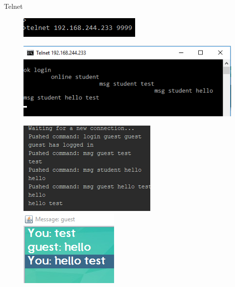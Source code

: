 \documentclass{beamer}
\begin{document}
\begin{frame}{Telnet}
\begin{figure}
 \includegraphics[scale=1]{telnet}
\end{figure}
\begin{figure}
 \includegraphics[scale=0.5]{msg_telnet}
\end{figure}
\begin{figure}

 \centering
  \begin{minipage}[b]{0.4\textwidth}
\includegraphics[width=\textwidth,left]{msg_console}
\end{minipage}
  \hfill
  \begin{minipage}[b]{0.4\textwidth}
\includegraphics[width=\textwidth,right]{msg_app}
 \end{minipage}
\end{figure}
\end{frame}
\end{document}
